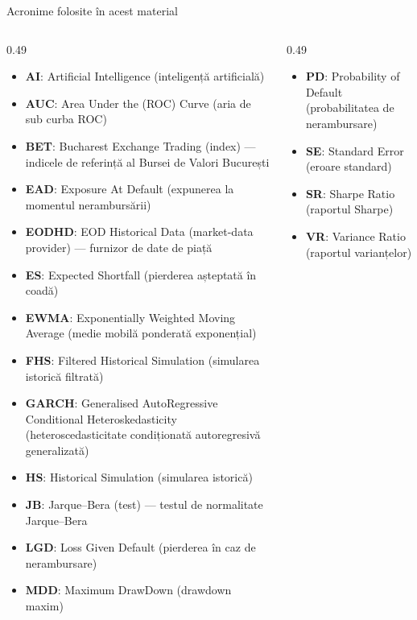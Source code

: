 \begin{frame}{Acronime folosite în acest material}
\begin{columns}[T]
\begin{column}{0.49\textwidth}
\begin{itemize}\setlength{\itemsep}{0pt}
    \item \textbf{AI}: Artificial Intelligence (inteligență artificială)
    \item \textbf{AUC}: Area Under the (ROC) Curve (aria de sub curba ROC)
    \item \textbf{BET}: Bucharest Exchange Trading (index) — indicele de referință al Bursei de Valori București
    \item \textbf{EAD}: Exposure At Default (expunerea la momentul nerambursării)
    \item \textbf{EODHD}: EOD Historical Data (market-data provider) — furnizor de date de piață
    \item \textbf{ES}: Expected Shortfall (pierderea așteptată în coadă)
    \item \textbf{EWMA}: Exponentially Weighted Moving Average (medie mobilă ponderată exponențial)
    \item \textbf{FHS}: Filtered Historical Simulation (simularea istorică filtrată)
    \item \textbf{GARCH}: Generalised AutoRegressive Conditional Heteroskedasticity (heteroscedasticitate condiționată autoregresivă generalizată)
    \item \textbf{HS}: Historical Simulation (simularea istorică)
    \item \textbf{JB}: Jarque–Bera (test) — testul de normalitate Jarque–Bera
    \item \textbf{LGD}: Loss Given Default (pierderea în caz de nerambursare)
    \item \textbf{MDD}: Maximum DrawDown (drawdown maxim)
\end{itemize}
\end{column}
\begin{column}{0.49\textwidth}
\begin{itemize}\setlength{\itemsep}{0pt}
    \item \textbf{PD}: Probability of Default (probabilitatea de nerambursare)
    \item \textbf{SE}: Standard Error (eroare standard)
    \item \textbf{SR}: Sharpe Ratio (raportul Sharpe)
    \item \textbf{VR}: Variance Ratio (raportul varianțelor)
\end{itemize}
\end{column}
\end{columns}
\end{frame}


